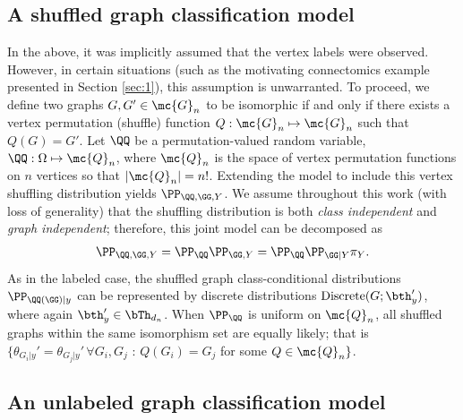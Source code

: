 \documentclass[10pt,journal,cspaper,compsoc]{IEEEtran}
\newcommand{\Qs}{Q}
\begin{document}

\subsection{A shuffled graph classification model} %
\label{sub:a_shuffled_graph_classification_model}


In the above, it was implicitly assumed that the vertex labels were observed.  However, in certain situations (such as the motivating connectomics example presented in Section \ref{sec:1}), this assumption is unwarranted.  To proceed, we define two graphs $G,G' \in \mc{G}_n$ to be isomorphic if and only if there exists a vertex permutation (shuffle) function $\Qs:\mc{G}_n \mapsto \mc{G}_n$ such that $\Qs(G)=G'$.  Let $\QQ$ be a permutation-valued random variable, $\QQ:\Omega \mapsto \mc{Q}_n$, where $\mc{Q}_n$ is the space of vertex permutation functions on $n$ vertices so that $|\mc{Q}_n|=n!$.  Extending the model to include this vertex shuffling distribution yields $\PP_{\QQ,\GG,Y}$.  We assume throughout this work (with loss of generality) that the shuffling distribution is both \emph{class independent} and \emph{graph independent}; therefore, this joint model can be decomposed as
\begin{align}
	\PP_{\QQ,\GG,Y} = \PP_{\QQ} \PP_{\GG,Y} = \PP_{\QQ} \PP_{\GG |Y} \pi_Y.
\end{align}
As in the labeled case, the shuffled graph class-conditional distributions $\PP_{\QQ(\GG)|y}$ can be represented by discrete distributions $\text{Discrete}(G; \bth_y')$, where again $\bth_y' \in \bTh_{d_n}$.  When $\PP_{\QQ}$ is uniform on $\mc{Q}_n$, all shuffled graphs within the same isomorphism set are equally likely; that is  $\{\theta_{G_i|y}' = \theta_{G_j|y}' \, \forall G_i,G_j$ : $\Qs(G_i)=G_j$ for some $\Qs \in \mc{Q}_n\}$.


\subsection{An unlabeled graph classification model} %
\label{sub:an_unlabeled_graph_classification_model}

\end{document}
